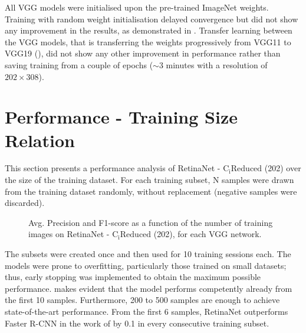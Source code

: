 All VGG models were initialised upon the pre-trained ImageNet weights. Training with random weight initialisation delayed convergence but did not show any improvement in the results, as demonstrated in \cite{bargoti2017deep}. Transfer learning between the VGG models, that is transferring the weights progressively from VGG11 to VGG19 (\cite{simonyan2014very}), did not show any other improvement in performance rather than saving training from a couple of epochs ($\sim3$ minutes with a resolution of $202\times308$).


\section{Performance - Training Size Relation}\label{size_relation}

This section presents a performance analysis of RetinaNet - $\text{C}_\text{i}\text{Reduced}$ (202)	over the size of the training dataset. For each training subset, N samples were drawn from the training dataset randomly, without replacement (negative samples were discarded). 

 \begin{figure}[!htb]
  \centering
  \caption{Avg. Precision and F1-score as a function of the number of training images on RetinaNet - $\text{C}_\text{i}\text{Reduced}$ (202), for each VGG network.}
  \label{ch5:fig3}
\end{figure}

The subsets were created once and then used for 10 training sessions each. The models were prone to overfitting, particularly those trained on small datasets; thus, early stopping was implemented to obtain the maximum possible performance.  makes evident that the model performs competently already from the first 10 samples. Furthermore, 200 to 500 samples are enough to achieve state-of-the-art performance. From the first 6 samples, RetinaNet outperforms Faster R-CNN in the work of \cite{bargoti2017deep} by 0.1 in every consecutive training subset.




